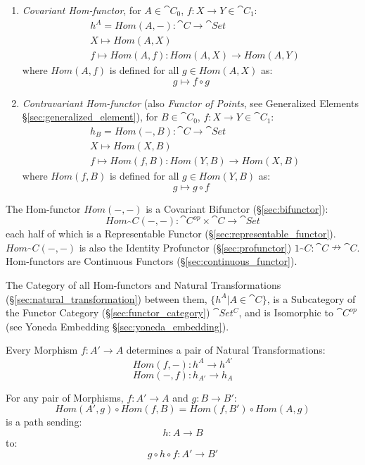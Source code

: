 \begin{enumerate}
  \item \emph{Covariant Hom-functor}, for $A \in \cat{C}_0$, $f : X
    \rightarrow Y \in \cat{C}_1$:
\[
\begin{split}
  & h^A = Hom(A,-) : \cat{C} \rightarrow \cat{Set} \\
  & X \mapsto Hom(A,X) \\
  & f \mapsto Hom(A,f) : Hom(A,X) \rightarrow Hom(A,Y)
\end{split}
\]
  where $Hom(A,f)$ is defined for all $g \in Hom(A,X)$ as:
\[
  g \mapsto f \circ g
\]

  \item \emph{Contravariant Hom-functor} (also \emph{Functor of
    Points}, see Generalized Elements
    \S\ref{sec:generalized_element}), for $B \in \cat{C}_0$, $f : X
    \rightarrow Y \in \cat{C}_1$:
\[
\begin{split}
  & h_B = Hom(-,B) : \cat{C} \rightarrow \cat{Set} \\
  & X \mapsto Hom(X,B) \\
  & f \mapsto Hom(f,B) : Hom(Y,B) \rightarrow Hom(X,B)
\end{split}
\]
  where $Hom(f,B)$ is defined for all $g \in Hom(Y,B)$ as:
\[
  g \mapsto g \circ f
\]
\end{enumerate}

The Hom-functor $Hom(-,-)$ is a Covariant Bifunctor
(\S\ref{sec:bifunctor}):
\[
  Hom_\cat{C}(-,-):
    \cat{C}^{op} \times \cat{C} \rightarrow \cat{Set}
\]
each half of which is a Representable Functor
(\S\ref{sec:representable_functor}). $Hom_\cat{C}(-,-)$ is also the
Identity Profunctor (\S\ref{sec:profunctor}) $1_\cat{C} :
\cat{C} \nrightarrow \cat{C}$. Hom-functors are Continuous
Functors (\S\ref{sec:continuous_functor}).

The Category of all Hom-functors and Natural Transformations
(\S\ref{sec:natural_transformation}) between them, $\{ h^A | A \in
\cat{C} \}$, is a Subcategory of the Functor Category
(\S\ref{sec:functor_category}) $\cat{Set^C}$, and is Isomorphic to
$\cat{C^{op}}$ (see Yoneda Embedding \S\ref{sec:yoneda_embedding}).

Every Morphism $f : A' \rightarrow A$ determines a pair of Natural
Transformations:
\[
  Hom(f,-) : h^A \rightarrow h^{A'}
\]\[
  Hom(-,f) : h_{A'} \rightarrow h_A
\]

For any pair of Morphisms, $f : A' \rightarrow A$ and $g : B
\rightarrow B'$:
\[
  Hom(A',g) \circ Hom(f,B) = Hom(f,B') \circ Hom(A,g)
\]
is a path sending:
\[
  h : A \rightarrow B
\]
to:
\[
  g \circ h \circ f : A' \rightarrow B'
\]



